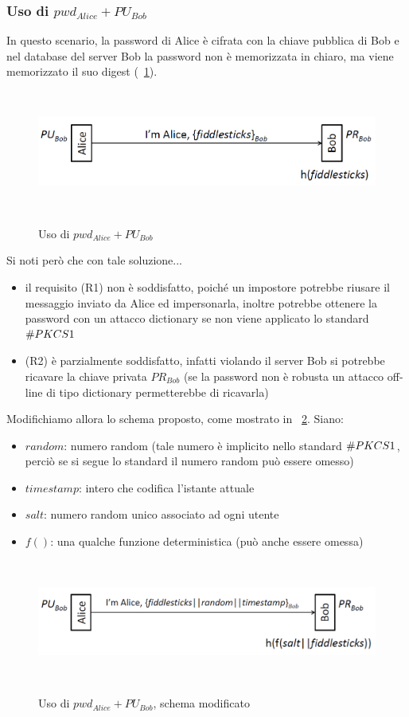 \subsubsection{Uso di $pwd_{Alice} + PU_{Bob}$}
In questo scenario, la password di Alice è cifrata con la chiave pubblica di Bob e nel database del server Bob la password non è memorizzata in chiaro, ma viene memorizzato il suo digest (\figurename~\ref{fig:ImgS37}).
\begin{figure}[htbp]
	\centering%
	\subfigure%
	{\includegraphics[height=4cm, width=12cm, keepaspectratio]{Immagini/autenticazione/ImgS37.png}}
	\caption{Uso di $pwd_{Alice} + PU_{Bob}$\label{fig:ImgS37}} 	
\end{figure}
Si noti però che con tale soluzione...
\begin{itemize}
	\item il requisito (R1) non è soddisfatto, poiché un impostore potrebbe riusare il messaggio inviato da Alice ed
	impersonarla, inoltre potrebbe ottenere la password con un attacco dictionary se non viene applicato lo standard $\symbol{35}PKCS1$
	\item (R2) è parzialmente soddisfatto, infatti violando il server Bob si potrebbe ricavare la chiave privata $PR_{Bob}$ (se la password non è robusta un attacco off-line di tipo dictionary permetterebbe di ricavarla)
\end{itemize}
Modifichiamo allora lo schema proposto, come mostrato in \figurename~\ref{fig:ImgS39}. Siano:
\begin{itemize}
	\item $random$: numero random (tale numero è implicito nello standard $\symbol{35}PKCS1$, perciò se si segue lo standard il numero random può essere omesso)
	\item $timestamp$: intero che codifica l'istante attuale
	\item $salt$: numero random unico associato ad ogni utente
	\item $f()$: una qualche funzione deterministica (può anche essere omessa)
\end{itemize} 
\begin{figure}[htbp]
	\centering%
	\subfigure%
	{\includegraphics[height=4cm, width=12cm, keepaspectratio]{Immagini/autenticazione/ImgS39.png}}
	\caption{Uso di $pwd_{Alice} + PU_{Bob}$, schema modificato\label{fig:ImgS39}} 	
\end{figure}
